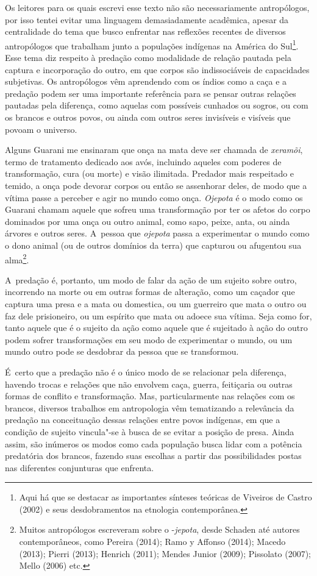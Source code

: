 Os leitores para os quais escrevi esse texto não são necessariamente
antropólogos, por isso tentei evitar uma linguagem demasiadamente
acadêmica, apesar da centralidade do tema que busco enfrentar nas
reflexões recentes de diversos antropólogos que trabalham junto a
populações indígenas na América do Sul\footnote{Aqui há que se destacar
as importantes sínteses teóricas de Viveiros de Castro (2002) e seus
desdobramentos na etnologia contemporânea.}. Esse tema diz respeito à
predação como modalidade de relação pautada pela captura e incorporação
do outro, em que corpos são indissociáveis de capacidades subjetivas.
Os antropólogos vêm aprendendo com os índios como a caça e a predação
podem ser uma importante referência para se pensar outras relações
pautadas pela diferença, como aquelas com possíveis cunhados ou sogros,
ou com os brancos e outros povos, ou ainda com outros seres invisíveis
e visíveis que povoam o universo.

Alguns Guarani me ensinaram que onça na mata deve ser chamada de
\emph{xeramõi}, termo de tratamento dedicado aos avós, incluindo aqueles com
poderes de transformação, cura (ou morte) e visão ilimitada. Predador
mais respeitado e temido, a onça pode devorar corpos ou então se
assenhorar deles, de modo que a vítima passe a perceber e agir no mundo
como onça. \emph{Ojepota} é o modo como os Guarani chamam aquele que sofreu
uma transformação por ter os afetos do corpo dominados por uma onça ou
outro animal, como sapo, peixe, anta, ou ainda árvores e outros seres.
A~pessoa que \emph{ojepota} passa a experimentar o mundo como o dono animal
(ou de outros domínios da terra) que capturou ou afugentou sua
alma\footnote{Muitos antropólogos escreveram sobre o -\emph{jepota}, desde
Schaden até autores contemporâneos, como Pereira (2014); Ramo y Affonso
(2014); Macedo (2013); Pierri (2013); Henrich (2011); Mendes Junior
(2009); Pissolato (2007); Mello (2006) etc.}.

A~predação é, portanto, um modo de falar da ação de um sujeito sobre
outro, incorrendo na morte ou em outras formas de alteração, como um
caçador que captura uma presa e a mata ou domestica, ou um guerreiro
que mata o outro ou faz dele prisioneiro, ou um espírito que mata ou
adoece sua vítima. Seja como for, tanto aquele que é o sujeito da ação
como aquele que é sujeitado à ação do outro podem sofrer transformações
em seu modo de experimentar o mundo, ou um mundo outro pode se
desdobrar da pessoa que se transformou.

É~certo que a predação não é o único modo de se relacionar pela
diferença, havendo trocas e relações que não envolvem caça, guerra,
feitiçaria ou outras formas de conflito e transformação. Mas,
particularmente nas relações com os brancos, diversos trabalhos em
antropologia vêm tematizando a relevância da predação na conceituação
dessas relações entre povos indígenas, em que a condição de sujeito
vincula"-se à busca de se evitar a posição de presa. Ainda assim, são
inúmeros os modos como cada população busca lidar com a potência
predatória dos brancos, fazendo suas escolhas a partir das
possibilidades postas nas diferentes conjunturas que enfrenta.

